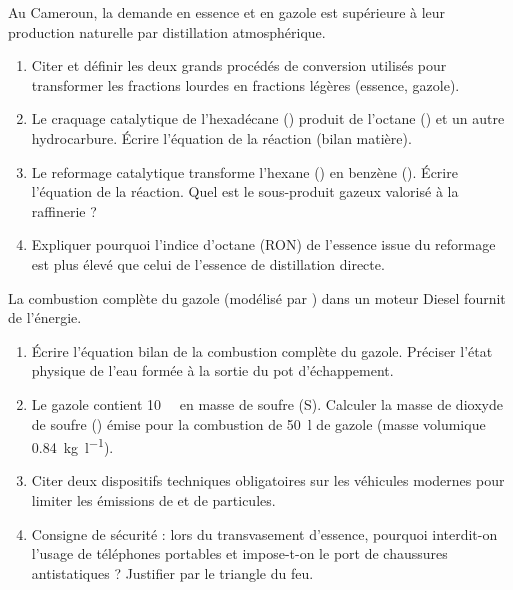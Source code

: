 \documentclass[11pt]{article}
\begin{document}
\begin{exercice}
Au Cameroun, la demande en essence et en gazole est supérieure à leur production naturelle par distillation atmosphérique.
\begin{enumerate}
    \item Citer et définir les deux grands procédés de conversion utilisés pour transformer les fractions lourdes en fractions légères (essence, gazole).
    \item Le craquage catalytique de l'hexadécane () produit de l'octane () et un autre hydrocarbure. Écrire l'équation de la réaction (bilan matière).
    \item Le reformage catalytique transforme l'hexane () en benzène (). Écrire l'équation de la réaction. Quel est le sous-produit gazeux valorisé à la raffinerie ?
    \item Expliquer pourquoi l'indice d'octane (RON) de l'essence issue du reformage est plus élevé que celui de l'essence de distillation directe.
\end{enumerate}
\end{exercice}

\begin{exercice}
La combustion complète du gazole (modélisé par ) dans un moteur Diesel fournit de l'énergie.
\begin{enumerate}
    \item Écrire l'équation bilan de la combustion complète du gazole. Préciser l'état physique de l'eau formée à la sortie du pot d'échappement.
    \item Le gazole contient \qty{10}{\per\million} en masse de soufre (S). Calculer la masse de dioxyde de soufre () émise pour la combustion de \qty{50}{\litre} de gazole (masse volumique \qty{0,84}{\kilogram\per\litre}).
    \item Citer deux dispositifs techniques obligatoires sur les véhicules modernes pour limiter les émissions de  et de particules.
    \item Consigne de sécurité : lors du transvasement d'essence, pourquoi interdit-on l'usage de téléphones portables et impose-t-on le port de chaussures antistatiques ? Justifier par le triangle du feu.
\end{enumerate}
\end{exercice}
\end{document}
